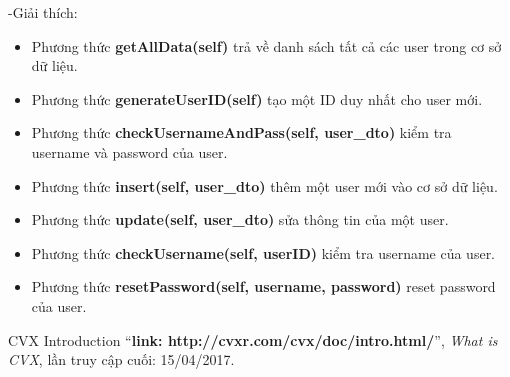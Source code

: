 \documentclass[a4paper]{article}
\begin{document}
\begin{flushleft}
	-Giải thích:
	\begin{itemize}
		\item Phương thức \textbf{getAllData(self)} trả về danh sách tất cả các user trong cơ sở dữ liệu.

		\item Phương thức \textbf{generateUserID(self)} tạo một ID duy nhất cho user mới.

		\item Phương thức \textbf{checkUsernameAndPass(self, user\_dto)} kiểm tra username và password của user.

		\item Phương thức \textbf{insert(self, user\_dto)} thêm một user mới vào cơ sở dữ liệu.

		\item Phương thức \textbf{update(self, user\_dto)} sửa thông tin của một user.

		\item Phương thức \textbf{checkUsername(self, userID)} kiểm tra username của user.

		\item Phương thức \textbf{resetPassword(self, username, password)} reset password của user.

	\end{itemize}
\end{flushleft}
\clearpage

\newpage
\begin{thebibliography}{80}

	CVX Introduction
	``\textbf{link: http://cvxr.com/cvx/doc/intro.html/}'',
	\textit{What is CVX}, lần truy cập cuối: 15/04/2017.

\end{thebibliography}
\end{document}
